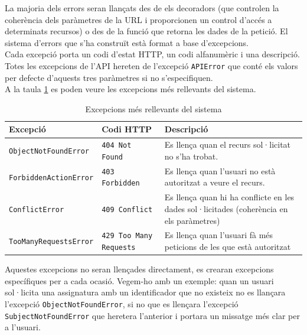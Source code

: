 La majoria dels errors seran llançats des de els decoradors (que controlen la coherència dels paràmetres de la \ac{URL} i proporcionen un control d'accés a determinats recursos) o des de la funció que retorna les dades de la petició. El sistema d'errors que s'ha construït està format a base d'excepcions.\\

Cada excepció porta un codi d'estat \ac{HTTP}, un codi alfanumèric i una descripció. Totes les excepcions de l'\ac{API} hereten de l'excepció \texttt{APIError} que conté els valors per defecte d'aquests tres paràmetres si no s'especifiquen.\\

A la taula \ref{table:excepcions} es poden veure les excepcions més rellevants del sistema.

\begin{table}[h!]
	\begin{center}
 		\begin{tabularx}{\textwidth}{|l|l|X|}
  			\hline
 			\bfseries Excepció & \bfseries Codi \ac{HTTP} & \bfseries Descripció\\ \hline
			\texttt{ObjectNotFoundError} & \texttt{404 Not Found} &  Es llença quan el recurs sol·licitat no s'ha trobat.\\ \hline
			\texttt{ForbiddenActionError} & \texttt{403 Forbidden} & Es llença quan l'usuari no està autoritzat a veure el recurs. \\ \hline
			\texttt{ConflictError} & \texttt{409 Conflict} & Es llença quan hi ha conflicte en les dades sol·licitades (coherència en els paràmetres) \\ \hline
			\texttt{TooManyRequestsError} & \texttt{429 Too Many Requests} & Es llença quan l'usuari fà més peticions de les que està autoritzat \\ \hline
		\end{tabularx}
	\end{center}
	\caption{Excepcions més rellevants del sistema}
	\label{table:excepcions}
\end{table}

Aquestes excepcions no seran llençades directament, es crearan excepcions específiques per a cada ocasió. Vegem-ho amb un exemple: quan un usuari sol·licita una assignatura amb un identificador que no existeix no es llançara l'excepció \texttt{ObjectNotFoundError}, si no que es llençara l'excepció \texttt{SubjectNotFoundError} que heretera l'anterior i portara un missatge més clar per a l'usuari.\\


